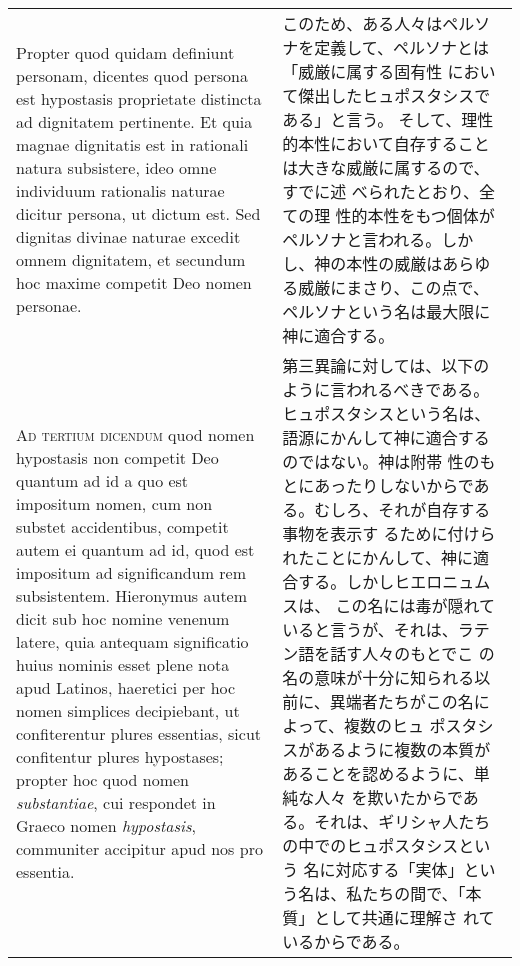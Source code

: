 \documentclass[10pt]{jsarticle} %
\begin{document}
\begin{longtable}{p{21em}p{21em}}
\\


 Propter quod quidam definiunt personam, dicentes quod
persona est hypostasis proprietate distincta ad dignitatem
pertinente. 
Et quia magnae dignitatis est in rationali natura
subsistere, ideo omne individuum rationalis naturae dicitur persona, ut
dictum est. Sed dignitas divinae naturae excedit omnem dignitatem, et
secundum hoc maxime competit Deo nomen personae.


&

このため、ある人々はペルソナを定義して、ペルソナとは「威厳に属する固有性
 において傑出したヒュポスタシスである」と言う。
そして、理性的本性において自存することは大きな威厳に属するので、すでに述
 べられたとおり、全ての理
 性的本性をもつ個体がペルソナと言われる。しかし、神の本性の威厳はあらゆ
 る威厳にまさり、この点で、ペルソナという名は最大限に神に適合する。



\\



{\scshape Ad tertium dicendum} quod nomen hypostasis non competit Deo quantum ad id
a quo est impositum nomen, cum non substet accidentibus, competit autem
ei quantum ad id, quod est impositum ad significandum rem
subsistentem. Hieronymus autem dicit sub hoc nomine venenum latere, quia
antequam significatio huius nominis esset plene nota apud Latinos,
haeretici per hoc nomen simplices decipiebant, ut confiterentur plures
essentias, sicut confitentur plures hypostases; propter hoc quod nomen
{\itshape substantiae}, cui respondet in Graeco nomen {\itshape hypostasis}, communiter
accipitur apud nos pro essentia.


&

第三異論に対しては、以下のように言われるべきである。
ヒュポスタシスという名は、語源にかんして神に適合するのではない。神は附帯
 性のもとにあったりしないからである。むしろ、それが自存する事物を表示す
 るために付けられたことにかんして、神に適合する。しかしヒエロニュムスは、
 この名には毒が隠れていると言うが、それは、ラテン語を話す人々のもとでこ
 の名の意味が十分に知られる以前に、異端者たちがこの名によって、複数のヒュ
 ポスタシスがあるように複数の本質があることを認めるように、単純な人々
 を欺いたからである。それは、ギリシャ人たちの中でのヒュポスタシスという
 名に対応する「実体」という名は、私たちの間で、「本質」として共通に理解さ
 れているからである。


\\




\end{longtable}
\end{document}
